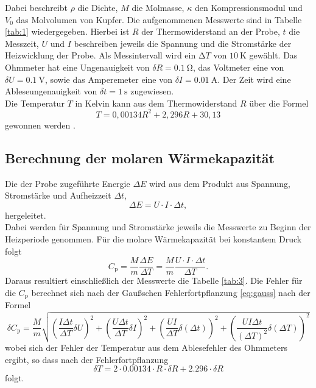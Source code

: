 Dabei beschreibt $\rho$ die Dichte, $M$ die Molmasse, $\kappa$ den Kompressionsmodul und $V_0$ das Molvolumen von Kupfer.
Die aufgenommenen Messwerte sind in Tabelle \ref{tab:1} wiedergegeben.
Hierbei ist $R$ der Thermowiderstand an der Probe, $t$ die Messzeit, $U$ und $I$ beschreiben jeweils die Spannung und die Stromstärke der Heizwicklung der Probe.
Als Messintervall wird ein $\increment T$ von $\SI{10}{\kelvin}$ gewählt.
Das Ohmmeter hat eine Ungenauigkeit von $\delta R = \SI{0.1}{\ohm}$, das Voltmeter eine von $\delta U = \SI{0.1}{\volt}$, sowie das Amperemeter eine von $\delta I = \SI{0.01}{\ampere}$.
Der Zeit wird eine Ableseungenauigkeit von $\delta t = \SI{1}{\second}$ zugewiesen.\\
Die Temperatur $T$ in Kelvin kann aus dem Thermowiderstand $R$ über die Formel
\begin{equation}
  T = 0,00134R^2+2,296R+30,13
\end{equation}
gewonnen werden \cite{skript}.


\newpage

\subsection{Berechnung der molaren Wärmekapazität}
Die der Probe zugeführte Energie $\Delta E$ wird aus dem Produkt aus Spannung, Stromstärke und Aufheizzeit $\Delta t$,
\begin{equation}
  \Delta E =  U\cdot I\cdot \Delta t,
\end{equation}
hergeleitet.\\
Dabei werden für Spannung und Stromstärke jeweils die Messwerte zu Beginn der Heizperiode genommen.
Für die molare Wärmekapazität bei konstantem Druck folgt
\begin{equation}
  C_{\text{p}} = \frac{M}{m}\frac{\Delta E}{\Delta T} = \frac{M}{m}\frac{U\cdot I\cdot \Delta t}{\Delta T}.
\end{equation}
Daraus resultiert einschließlich der Messwerte die Tabelle \ref{tab:3}.
Die Fehler für die $C_{\text{p}}$ berechnet sich nach der Gaußschen Fehlerfortpflanzung \eqref{eq:gauss} nach der Formel
\begin{equation}
  \delta C_\text{p} = \frac{M}{m} \sqrt{ \left(\frac{I \Delta t}{\Delta T} \delta U \right)^2 + \left( \frac{U \Delta t}{\Delta T} \delta I \right)^2 + \left(\frac{U I}{\Delta T} \delta(\Delta t) \right)^2 + \left( \frac{U I \Delta t}{(\Delta T)^2} \delta(\Delta T)\right)^2 }
\end{equation}
wobei sich der Fehler der Temperatur aus dem Ablesefehler des Ohmmeters ergibt, so dass nach der Fehlerfortpflanzung
\begin{equation}
 \delta T = 2 \cdot 0.00134 \cdot R \cdot \delta R + 2.296 \cdot \delta R
\end{equation}
folgt.


